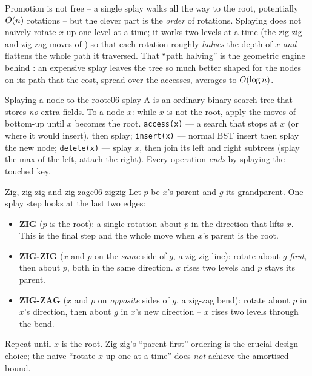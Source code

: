 Promotion is not free -- a single splay walks all the way to the root, potentially $O(n)$ rotations --
but the clever part is the \emph{order} of rotations. Splaying does not naively rotate $x$ up one level at
a time; it works two levels at a time (the zig-zig and zig-zag moves of ) so that each
rotation roughly \emph{halves} the depth of $x$ \emph{and} flattens the whole path it traversed. That
``path halving'' is the geometric engine behind : an expensive splay leaves the tree so
much better shaped for the nodes on its path that the cost, spread over the accesses, averages to
$O(\log n)$.

\begin{definition}{Splaying a node to the root}{c06-splay}
A  is an ordinary binary search tree that stores \emph{no} extra fields. To
 a node $x$: while $x$ is not the root, apply the moves of  bottom-up
until $x$ becomes the root. \texttt{access(x)} --- a search that stops at $x$ (or where it would insert),
then splay; \texttt{insert(x)} --- normal BST insert then splay the new node; \texttt{delete(x)} --- splay
$x$, then join its left and right subtrees (splay the max of the left, attach the right). Every operation
\emph{ends} by splaying the touched key.
\end{definition}

\begin{definition}{Zig, zig-zig and zig-zag}{c06-zigzig}
Let $p$ be $x$'s parent and $g$ its grandparent. One splay step looks at the last two edges:
\begin{itemize}[nosep]
  \item \textbf{ZIG} ($p$ is the root): a single rotation about $p$ in the direction that lifts $x$. This
        is the final step and the whole move when $x$'s parent is the root.
  \item \textbf{ZIG-ZIG} ($x$ and $p$ on the \emph{same} side of $g$, a zig-zig line): rotate about $g$
        \emph{first}, then about $p$, both in the same direction. $x$ rises two levels and $p$ stays its
        parent.
  \item \textbf{ZIG-ZAG} ($x$ and $p$ on \emph{opposite} sides of $g$, a zig-zag bend): rotate about $p$
        in $x$'s direction, then about $g$ in $x$'s new direction -- $x$ rises two levels through the bend.
\end{itemize}
Repeat until $x$ is the root. Zig-zig's ``parent first'' ordering is the crucial design choice; the naive
``rotate $x$ up one at a time'' does \emph{not} achieve the amortised bound.
\end{definition}

